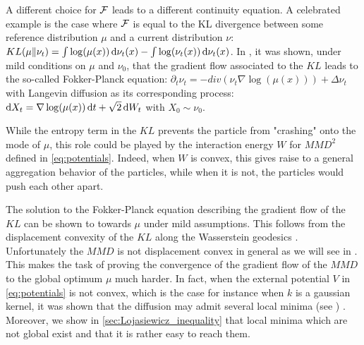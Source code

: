\begin{remark}
A different choice for ${{\mathcal F}}$  leads to a different continuity equation. A celebrated example is the case where ${{\mathcal F}}$ is equal to the KL divergence between some reference distribution $\mu$ and a current distribution $\nu$: $KL(\mu\Vert \nu_t ) =  \int \log (\mu(x))\mathop{}\!\mathrm{d} \nu_t(x) -\int \log(\nu_t(x))\mathop{}\!\mathrm{d} \nu_t(x)$. In \cite{jordan1998variational}, it was shown, under mild conditions on $\mu$ and $\nu_0$, that the gradient flow associated to the $KL$ leads to the so-called Fokker-Planck equation: $ \partial_t \nu_t = - div(\nu_t \nabla \log(\mu(x))) + \Delta \nu_t $ with Langevin diffusion as its corresponding process: $\mathop{}\!\mathrm{d} X_t = \nabla \log(\mu(x))\mathop{}\!\mathrm{d} t + \sqrt{2} \mathop{}\!\mathrm{d} W_t $ with $X_0\sim \nu_0$.
 
 While the entropy term in the $KL$ prevents the particle from "crashing" onto the mode of $\mu$, this role could be played by the interaction energy $W$ for $MMD^2$ defined in \cref{eq:potentials}. Indeed, when $W$ is convex, this gives raise to a general aggregation behavior of the particles, while when it is not, the particles would push each other apart.  

The solution to the Fokker-Planck equation describing the gradient flow of the $KL$ can be shown to towards $\mu$ under mild assumptions. This follows from the displacement convexity of the $KL$ along the Wasserstein geodesics . Unfortunately the $MMD$ is not displacement convex in general as we will see in . This makes the task of proving the convergence of the gradient flow of the $MMD$ to the global optimum $\mu$ much harder. In fact, when the external potential $V$ in \cref{eq:potentials} is not convex, which is the case for instance when $k$ is a gaussian kernel, it was shown that the diffusion may admit several local minima (see \cite{herrmann2010non,tugaut2014phase}) . Moreover, we show in \cref{sec:Lojasiewicz_inequality} that local minima which are not global exist and that it is rather easy to reach them.
\end{remark}


